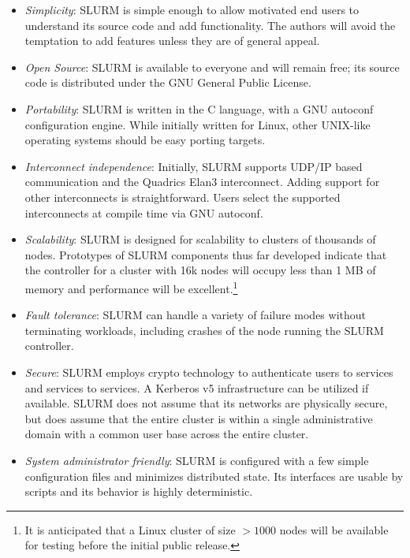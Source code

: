 \begin{itemize}
\item {\em Simplicity}: SLURM is simple enough to allow motivated end users
to understand its source code and add functionality.  The authors will 
avoid the temptation to add features unless they are of general appeal. 

\item {\em Open Source}: SLURM is available to everyone and will remain free;
its source code is distributed under the GNU General Public License.

\item {\em Portability}: SLURM is written in the C language, with a GNU 
autoconf configuration engine.  While initially written for Linux, 
other UNIX-like operating systems should be easy porting targets.

\item {\em Interconnect independence}: Initially, SLURM supports UDP/IP based
communication and the Quadrics Elan3 interconnect.  Adding support for other
interconnects is straightforward.  Users select the supported interconnects
at compile time via GNU autoconf.

\item {\em Scalability}: SLURM is designed for scalability to clusters of
thousands of nodes.
Prototypes of SLURM components thus far developed indicate that the
controller for a cluster with 16k nodes will occupy less than 1 MB 
of memory and performance will be excellent.\footnote{It is anticipated 
that a Linux cluster of size $>1000$ nodes will be available for testing 
before the initial public release.}

\item {\em Fault tolerance}: SLURM can handle a variety of failure modes
without terminating workloads, including crashes of the node running the SLURM
controller.

\item {\em Secure}: SLURM employs crypto technology to authenticate 
users to services and services to services.  
A Kerberos v5 infrastructure can be utilized if available.
SLURM does not assume that its networks are physically secure, 
but does assume that the entire cluster is within a single 
administrative domain with a common user base across the 
entire cluster.

\item {\em System administrator friendly}: SLURM is configured with a few
simple configuration files and minimizes distributed state.  Its interfaces
are usable by scripts and its behavior is highly deterministic.

\end{itemize}


